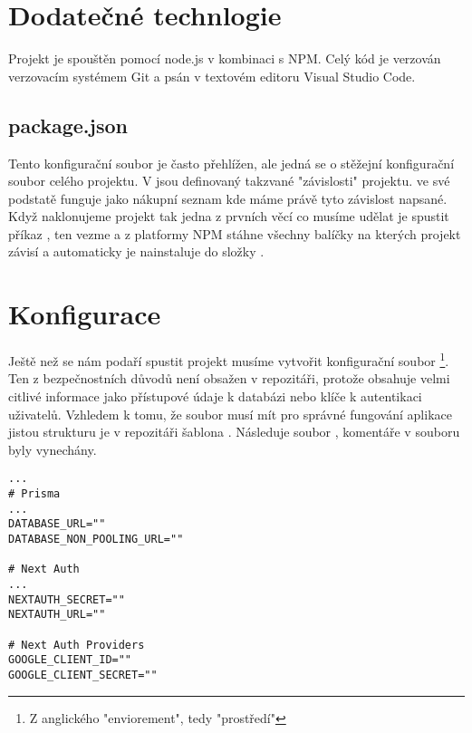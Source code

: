 \section{Dodatečné technlogie}
Projekt je spouštěn pomocí node.js v kombinaci s NPM. Celý kód je verzován verzovacím systémem Git a psán v textovém editoru Visual Studio Code.
\subsection{package.json}
Tento konfigurační soubor je často přehlížen, ale jedná se o stěžejní konfigurační soubor celého projektu. V  jsou definovaný takzvané "závislosti" projektu.  ve své podstatě funguje jako nákupní seznam kde máme právě tyto závislost napsané. Když naklonujeme projekt tak jedna z prvních věcí co musíme udělat je spustit příkaz , ten vezme  a z platformy NPM\cite{npm} stáhne všechny balíčky na kterých projekt závisí a automaticky je nainstaluje do složky .
\section{Konfigurace}
Ještě než se nám podaří spustit projekt musíme vytvořit konfigurační soubor \footnote{Z anglického "enviorement", tedy "prostředí"}. Ten z bezpečnostních důvodů není obsažen v repozitáři, protože obsahuje velmi citlivé informace jako přístupové údaje k databázi nebo klíče k autentikaci uživatelů. Vzhledem k tomu, že  soubor musí mít pro správné fungování aplikace jistou strukturu je v repozitáři šablona . Následuje soubor , komentáře v souboru byly vynechány.
\begin{lstlisting}[caption=Šablona konfiguračního souboru .env]
...
# Prisma
...
DATABASE_URL=""
DATABASE_NON_POOLING_URL=""

# Next Auth
...
NEXTAUTH_SECRET=""
NEXTAUTH_URL=""

# Next Auth Providers
GOOGLE_CLIENT_ID=""
GOOGLE_CLIENT_SECRET=""
\end{lstlisting}
